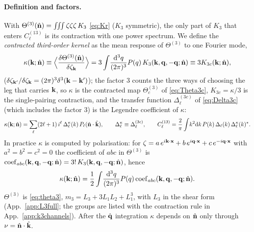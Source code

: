 \paragraph{Definition and factors.}  With $\Theta^{(3)}(\hat{\mathbf n})=\int\!\!\int\!\!\int\zeta\zeta\zeta\,K_3$ \eqref{eq:Kr} ($K_3$ symmetric), the only
part of $K_3$ that enters $C^{(13)}_\ell$ is its contraction with one power spectrum.  We define the \emph{contracted third-order kernel}
as the mean response of $\Theta^{(3)}$ to one Fourier mode,
\begin{equation}
\kappa(\mathbf k;\hat{\mathbf n})\equiv\Big\langle\frac{\delta\Theta^{(3)}(\hat{\mathbf n})}{\delta\zeta_\mathbf k}\Big\rangle
=3\int\!\frac{\mathrm d^3q}{(2\pi)^3}P(q)\,K_3(\mathbf k,\mathbf q,-\mathbf q;\hat{\mathbf n})\equiv3K_{3c}(\mathbf k;\hat{\mathbf n}),
\label{eq:kappa-def}
\end{equation}
($\delta\zeta_{\mathbf k'}/\delta\zeta_\mathbf k=(2\pi)^3\delta^3(\mathbf k-\mathbf k')$); the factor 3 counts the three ways of choosing the leg that carries $\mathbf k$, so
$\kappa$ is the contracted map $\Theta^{(3)}_c$ of \eqref{eq:Theta3c}, $K_{3c}=\kappa/3$ is the single-pairing contraction, and the transfer
function $\Delta^{(3c)}_\ell$ of \eqref{eq:Delta3c} (which includes the factor 3) is the Legendre coefficient of $\kappa$:
\begin{equation}
\kappa(\mathbf k;\hat{\mathbf n})=\sum_\ell(2\ell+1)\,i^\ell\,\Delta^{\kappa}_\ell(k)\,P_\ell(\hat{\mathbf n}\cdot\hat{\mathbf k}),\qquad \Delta^\kappa_\ell\equiv\Delta^{(3c)}_\ell,\qquad
C^{(13)}_\ell=\frac2\pi\int\!k^2\mathrm d k\,P(k)\,\Delta_\ell(k)\,\Delta^{\kappa}_\ell(k)^* .
\label{eq:asm-C13}
\end{equation}
In practice $\kappa$ is computed by polarisation: for $\zeta=a\,e^{i\mathbf k\cdot\mathbf x}+b\,e^{i\mathbf q\cdot\mathbf x}+c\,e^{-i\mathbf q\cdot\mathbf x}$ with $a^2=b^2=c^2=0$ the
coefficient of $abc$ in $\Theta^{(3)}$ is ${\rm coef}_{abc}(\mathbf k,\mathbf q,-\mathbf q;\hat{\mathbf n})=3!\,K_3(\mathbf k,\mathbf q,-\mathbf q;\hat{\mathbf n})$, hence
\begin{equation}
\kappa(\mathbf k;\hat{\mathbf n})=\frac12\int\!\frac{\mathrm d^3q}{(2\pi)^3}P(q)\,{\rm coef}_{abc}(\mathbf k,\mathbf q,-\mathbf q;\hat{\mathbf n}).
\label{eq:asm-kappa-coef}
\end{equation}
$\Theta^{(3)}$ is \eqref{eq:theta3}, $m_3=L_3+3L_1L_2+L_1^3$, with $L_3$ in the shear form (App.~\ref{app:L3full}; the groups are listed with the
contraction rule in App.~\ref{app:k3channels}).  After the $\hat{\mathbf q}$ integration $\kappa$ depends on $\hat{\mathbf n}$ only through $\nu=\hat{\mathbf n}\cdot\hat{\mathbf k}$.

